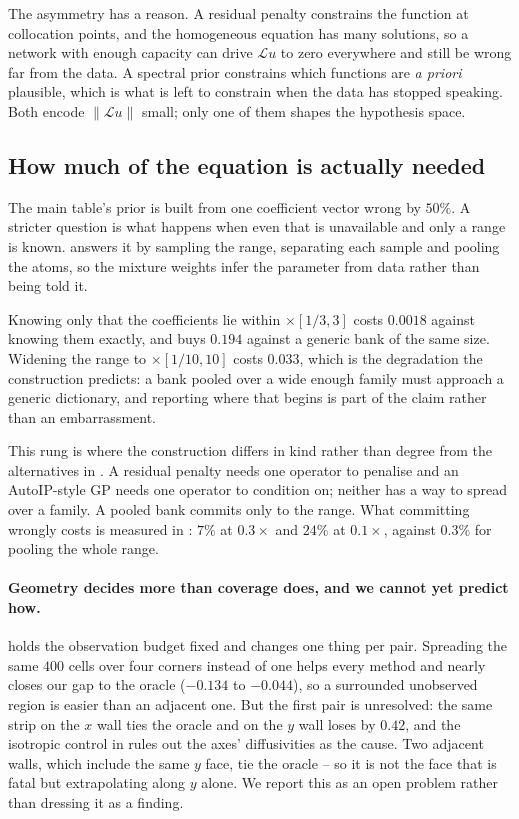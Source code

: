 The asymmetry has a reason.  A residual penalty constrains the function at
collocation points, and the homogeneous equation has many solutions, so a network
with enough capacity can drive $\mathcal{L}u$ to zero everywhere and still be
wrong far from the data.  A spectral prior constrains which functions are
\emph{a priori} plausible, which is what is left to constrain when the data has
stopped speaking.  Both encode $\lVert \mathcal{L}u \rVert$ small; only one of
them shapes the hypothesis space.

\subsection{How much of the equation is actually needed}



The main table's prior is built from one coefficient vector wrong by $50\%$.  A
stricter question is what happens when even that is unavailable and only a range
is known.   answers it by sampling the range, separating each
sample and pooling the atoms, so the mixture weights infer the parameter from
data rather than being told it.

Knowing only that the coefficients lie within $\times[1/3,3]$ costs $0.0018$
against knowing them exactly, and buys $0.194$ against a generic bank of the same
size.  Widening the range to $\times[1/10,10]$ costs $0.033$, which is the
degradation the construction predicts: a bank pooled over a wide enough family
must approach a generic dictionary, and reporting where that begins is part of
the claim rather than an embarrassment.

This rung is where the construction differs in kind rather than degree from the
alternatives in .  A residual penalty needs one
operator to penalise and an AutoIP-style GP needs one operator to condition on;
neither has a way to spread over a family.  A pooled bank commits only to the
range.  What committing wrongly costs is measured in :
$7\%$ at $0.3\times$ and $24\%$ at $0.1\times$, against $0.3\%$ for pooling the
whole range.

\paragraph{Geometry decides more than coverage does, and we cannot yet predict
how.}   holds the observation budget fixed and changes one
thing per pair.  Spreading the same $400$ cells over four corners instead of one
helps every method and nearly closes our gap to the oracle ($-0.134$ to
$-0.044$), so a surrounded unobserved region is easier than an adjacent one.  But
the first pair is unresolved: the same strip on the $x$ wall ties the oracle and
on the $y$ wall loses by $0.42$, and the isotropic control in
 rules out the axes' diffusivities as the cause.  Two
adjacent walls, which include the same $y$ face, tie the oracle -- so it is not
the face that is fatal but extrapolating along $y$ alone.  We report this as an
open problem rather than dressing it as a finding.

